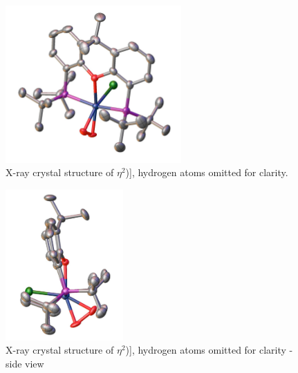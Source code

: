 \begin{figure}[htp]
\begin{center}
\includegraphics[width=0.6\textwidth]{../Figures/Crystalrhodium.pdf}
\caption[X-ray crystal structure of \ce{[Rh(tBu-xantphos)Cl(}$\eta^2$){]}]{X-ray crystal structure of \ce{[Rh(tBu-xantphos)Cl(}$\eta^2$)], hydrogen atoms omitted for clarity.}
\label{Crystal:rhodium}
\end{center}
\end{figure}

\begin{figure}[htp]
\begin{center}
\includegraphics[width=0.4\textwidth]{../Figures/Crystalrhodiumside.pdf}
\caption[X-ray crystal structure of \ce{[Rh(tBu-xantphos)Cl(}$\eta^2$){]} - side view]{X-ray crystal structure of \ce{[Rh(tBu-xantphos)Cl(}$\eta^2$)], hydrogen atoms omitted for clarity - side view}
\label{Crystal:rhodiumside}
\end{center}
\end{figure}

